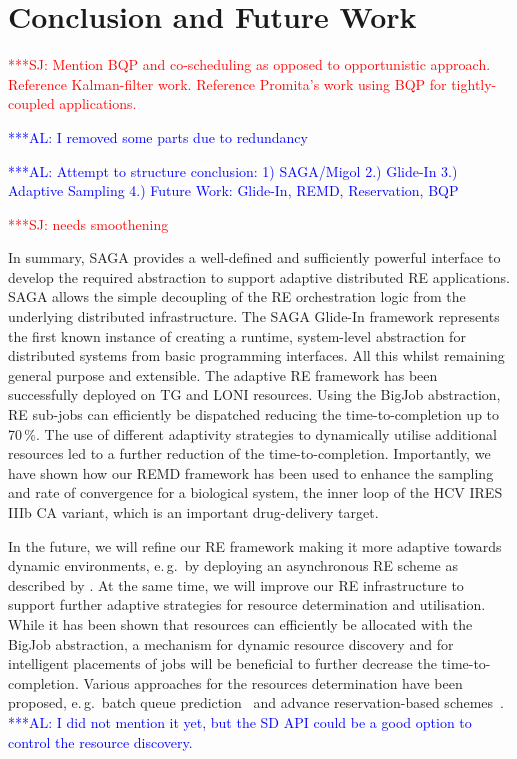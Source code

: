 \documentclass{rspublic}
\newcommand{\alnote}[1]{ {\textcolor{blue} { ***AL: #1 }}}
\newcommand{\jhanote}[1]{ {\textcolor{red} { ***SJ: #1 }}}
\newcommand{\alnote}[1]{}
\newcommand{\jhanote}[1]{}
\newcommand{\glidein}[1]{Glide-In }
\begin{document}
\section{Conclusion and Future Work}

\jhanote{Mention BQP and co-scheduling as opposed to opportunistic
  approach. Reference Kalman-filter work. Reference Promita's work
  using BQP for tightly-coupled applications.} 
                
\alnote{I removed some parts due to redundancy}

\alnote{Attempt to structure conclusion: 1) SAGA/Migol 2.) Glide-In
  3.) Adaptive Sampling 4.) Future Work: Glide-In, REMD, Reservation,
  BQP}
                                         
\jhanote{needs smoothening} 

In summary, SAGA provides a well-defined and sufficiently powerful
interface to develop the required abstraction to support adaptive
distributed RE applications.  SAGA allows the simple decoupling
of the RE orchestration logic from the underlying distributed
infrastructure. The SAGA \glidein\ framework represents the first
known instance of creating a runtime, system-level abstraction for
distributed systems from basic programming interfaces. All this whilst
remaining general purpose and extensible.  The adaptive RE framework
has been successfully deployed on TG and LONI resources.  Using
the BigJob abstraction, RE sub-jobs can efficiently be dispatched
reducing the time-to-completion up to 70\,\%. The use of different
adaptivity strategies to dynamically utilise additional resources led
to a further reduction of the time-to-completion.  Importantly, we
have shown how our REMD framework has been used to enhance the
sampling and rate of convergence for a biological system, the inner
loop of the HCV IRES IIIb CA variant, which is an important
drug-delivery target.

In the future, we will refine our RE framework making it
more adaptive towards dynamic environments, e.\,g.\ by deploying  
an asynchronous RE scheme as described by \citet{Gallicchio:2007yq}.
At the same time, we will improve our RE infrastructure to support
further adaptive strategies for resource determination and
utilisation.  While it has been shown that resources can efficiently
be allocated with the BigJob abstraction, a mechanism for dynamic
resource discovery and for intelligent placements of jobs will be
beneficial to further decrease the time-to-completion.  Various
approaches for the resources determination have been proposed, e.\,g.\
batch queue prediction~\citep{1254939,Chakraborty:2008nx} and advance
reservation-based schemes~\citep{Jeske:2007wj}.  \alnote{I did not
  mention it yet, but the SD API could be a good option to control the
  resource discovery.}
\end{document}
